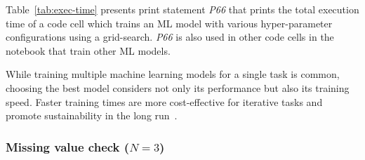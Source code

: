 Table~\ref{tab:exec-time} presents print statement \emph{P66} that prints the total execution time of a code cell which trains an ML model with various hyper-parameter configurations using a grid-search. \emph{P66} is also used in other code cells in the notebook that train other ML models.

While training multiple machine learning models for a single task is common, choosing the best model considers not only its performance but also its training speed. Faster training times are more cost-effective for iterative tasks and promote sustainability in the long run~\cite{CITEME}.


\subsubsection{Missing value check ($N = 3$)}

